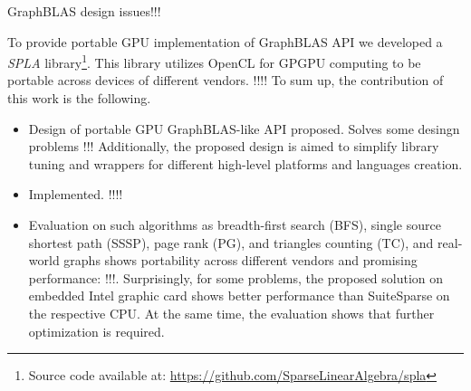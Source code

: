 GraphBLAS design issues!!! 

To provide portable GPU implementation of GraphBLAS API we developed a \textit{SPLA} library\footnote{Source code available at: \url{https://github.com/SparseLinearAlgebra/spla}}.
This library utilizes OpenCL for GPGPU computing to be portable across devices of different vendors.
!!!!
To sum up, the contribution of this work is the following.
\begin{itemize}
    \item Design of portable GPU GraphBLAS-like API proposed. Solves some desingn problems !!! Additionally, the proposed design is aimed to simplify library tuning and wrappers for different high-level platforms and languages creation.
    \item Implemented. !!!!
    \item Evaluation on such algorithms as breadth-first search (BFS), single source shortest path (SSSP), page rank (PG), and triangles counting (TC), and real-world graphs shows portability across different vendors and promising performance: !!!. Surprisingly, for some problems, the proposed solution on embedded Intel graphic card shows better performance than SuiteSparse on the respective CPU. At the same time, the evaluation shows that further optimization is required.
\end{itemize}